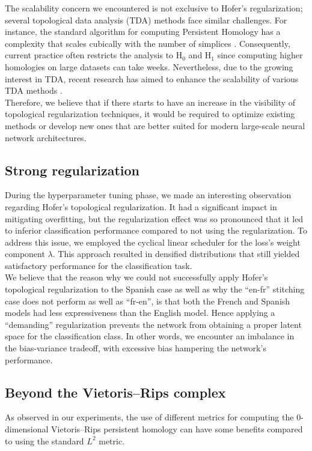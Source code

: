 \documentclass[../main.tex]{subfiles}
\begin{document}
The scalability concern we encountered is not exclusive to Hofer's regularization; several topological data analysis (TDA) methods face similar challenges. For instance, the standard algorithm for computing Persistent Homology has a complexity that scales cubically with the number of simplices \cite{akcora_reduction_2022}. Consequently, current practice often restricts the analysis to $\text{H}_0$ and $\text{H}_1$ since computing higher homologies on large datasets can take weeks. Nevertheless, due to the growing interest in TDA, recent research has aimed to enhance the scalability of various TDA methods \cite{akcora_reduction_2022, polianskii_breaking_2022}.\\

Therefore, we believe that if there starts to have an increase in the visibility of topological regularization techniques, it would be required to optimize existing methods or develop new ones that are better suited for modern large-scale neural network architectures.

\subsection{Strong regularization}

During the hyperparameter tuning phase, we made an interesting observation regarding Hofer's topological regularization. It had a significant impact in mitigating overfitting, but the regularization effect was so pronounced that it led to inferior classification performance compared to not using the regularization. To address this issue, we employed the cyclical linear scheduler for the loss's weight component $\lambda$. This approach resulted in densified distributions that still yielded satisfactory performance for the classification task.\\


We believe that the reason why we could not successfully apply Hofer's topological regularization to the Spanish case as well as why the ``en-fr'' stitching case does not perform as well as ``fr-en'', is that both the French and Spanish models had less expressiveness than the English model. Hence applying a ``demanding'' regularization prevents the network from obtaining a proper latent space for the classification class. In other words, we encounter an imbalance in the bias-variance tradeoff, with excessive bias hampering the network's performance.


\subsection{Beyond the Vietoris–Rips complex}
\label{sec:witness_topo}
As observed in our experiments, the use of different metrics for computing the 0-dimensional Vietoris–Rips persistent homology can have some benefits compared to using the standard $L^2$ metric.
\end{document}
